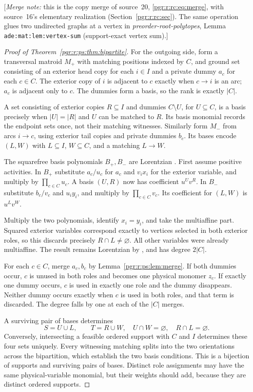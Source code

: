 \documentclass[11pt]{article}
\numberwithin{equation}{section}
\theoremstyle{definition}\newtheorem{definition}[theorem]{Definition}\newtheorem{remark}[theorem]{Remark}
\newcommand{\mnote}[1]{[\textit{Merge note:} #1]}
\newcommand{\prp}{\emph{preorder-root-polytopes}}
\begin{document}
\mnote{this is the copy merge of source~20, \eqref{pgr:r:rc:eq:merge},
with source~16's elementary realization (Section~\ref{pgr:r:rc:sec}).
The same operation glues two undirected graphs at a vertex in \prp,
Lemma \texttt{ade:mat:lem:vertex-sum} (support-exact vertex sum).}

\begin{proof}[Proof of Theorem~\ref{pgr:r:ps:thm:bipartite}]
For the outgoing side, form a transversal matroid $M_+$ with matching positions indexed by $C$, and ground set consisting of an exterior head copy for each $i\in I$ and a private dummy $a_c$ for each $c\in C$. The exterior copy of $i$ is adjacent to $c$ exactly when $c\to i$ is an arc; $a_c$ is adjacent only to $c$. The dummies form a basis, so the rank is exactly $|C|$.

A set consisting of exterior copies $R\subseteq I$ and dummies $C\setminus U$, for $U\subseteq C$, is a basis precisely when $|U|=|R|$ and $U$ can be matched to $R$. Its basis monomial records the endpoint sets once, not their matching witnesses. Similarly form $M_-$ from arcs $i\to c$, using exterior tail copies and private dummies $b_c$. Its bases encode $(L,W)$ with $L\subseteq I$, $W\subseteq C$, and a matching $L\to W$.

The squarefree basis polynomials $B_+,B_-$ are Lorentzian \cite[Theorem 3.10]{BH}. First assume positive activities. In $B_+$ substitute $a_c/u_c$ for $a_c$ and $v_ix_i$ for the exterior variable, and multiply by $\prod_{c\in C}u_c$. A basis $(U,R)$ now has coefficient $u^Uv^R$. In $B_-$ substitute $b_c/v_c$ and $u_iy_i$, and multiply by $\prod_{c\in C}v_c$. Its coefficient for $(L,W)$ is $u^Lv^W$.

Multiply the two polynomials, identify $x_i=y_i$, and take the multiaffine part. Squared exterior variables correspond exactly to vertices selected in both exterior roles, so this discards precisely $R\cap L\ne\varnothing$. All other variables were already multiaffine. The result remains Lorentzian by \cite[Theorem 2.10, Corollaries 2.32 and 3.5]{BH}, and has degree $2|C|$.

For each $c\in C$, merge $a_c,b_c$ by Lemma~\ref{pgr:r:ps:lem:merge}. If both dummies occur, $c$ is unused in both roles and becomes one physical monomer $z_c$. If exactly one dummy occurs, $c$ is used in exactly one role and the dummy disappears. Neither dummy occurs exactly when $c$ is used in both roles, and that term is discarded. The degree falls by one at each of the $|C|$ merges.

A surviving pair of bases determines
\[
 S=U\cup L,\qquad T=R\cup W,
 \quad U\cap W=\varnothing,\quad R\cap L=\varnothing.
\]
Conversely, intersecting a feasible ordered support with $C$ and $I$ determines these four sets uniquely. Every witnessing matching splits into the two orientations across the bipartition, which establish the two basis conditions. This is a bijection of supports and surviving pairs of bases. Distinct role assignments may have the same physical-variable monomial, but their weights should add, because they are distinct ordered supports.


\end{proof}
\end{document}
